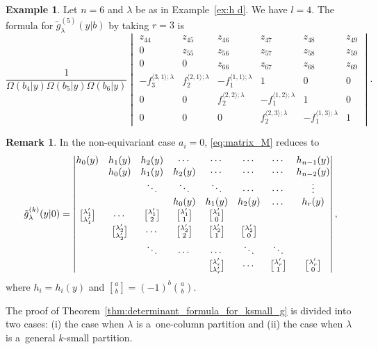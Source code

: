 \documentclass[10pt,a4paper]{amsart}
\numberwithin{equation}{section}
\newcommand{\la}{\lambda}
\theoremstyle{definition}
\newtheorem{Example}[Theorem]{Example}
\newtheorem{Remark}[Theorem]{Remark}
\begin{document}
\begin{Example}\label{ex:k small det}
Let $n=6$ and $\la$ be as in Example~\ref{ex:h d}. We have $l=4$.
The formula for $\tilde{g}^{(5)}_{\lambda}(y|b)$ by taking $r=3$ is
\[
\frac{1}{\Omega(b_4|y)\Omega(b_5|y)\Omega(b_6|y)}
\begin{vmatrix}
 z_{44}&z_{45}&z_{46}&z_{47}&z_{48}&z_{49}\\
 0&z_{55}&z_{56}&z_{57}&z_{58}&z_{59}\\
 0&0&z_{66}&z_{67}&z_{68}&z_{69}\\
 -f_3^{\langle 3,1\rangle;\la} & f_2^{\langle 2,1\rangle;\la} & -f_1^{\langle 1,1 \rangle;\la} & 1 & 0 & 0\\
 0&0&f_2^{\langle 2,2\rangle;\la}&-f_1^{\langle 1,2 \rangle;\la} & 1 &0\\
 0&0&0&f_2^{\langle 2,3\rangle;\la}&-f_1^{\langle 1,3 \rangle;\la} & 1
\end{vmatrix}.
\]
\end{Example}

\begin{Remark}
\bgroup
\renewcommand\binom[2]{\genfrac{[}{]}{0pt}{1}{#1}{#2}}
In the non-equivariant case $a_i=0$, \eqref{eq:matrix_M} reduces to
\[
\Tilde{g}^{(k)}_\lambda(y|0)=%
\begin{vmatrix}
h_0(y)&h_1(y)&h_2(y)&\cdots&\cdots&\cdots &\cdots &h_{n-1}(y)\\
&h_0(y)&h_1(y)&h_2(y)&\cdots&\cdots &\cdots &h_{n-2}(y)\\
&&\ddots&\ddots&\ddots&\cdots &\cdots &\vdots\\
&&&h_0(y)&h_1(y)&h_2(y)&\dots &h_r(y)\\
\binom{\lambda_1'}{\lambda_1'}&\cdots&\binom{\lambda_1'}{2}&\binom{\lambda_1'}{1}&\binom{\lambda_1'}{0}\\
&\binom{\lambda_2'}{\lambda_2'}&\cdots&\binom{\lambda_2'}{2}&\binom{\lambda'_2}{1}&\binom{\lambda_2'}{0}\\
&&\ddots&\cdots&\cdots&\ddots&\ddots\\
&&&&\binom{\lambda_r'}{\lambda_r'}&\cdots&\binom{\lambda_r'}{1}&\binom{\lambda_r'}{0}
\end{vmatrix},
\]
where $h_i=h_i(y)$ and $\binom{a}{b}=(-1)^b\genfrac{(}{)}{0pt}{1}{a}{b}$.
\egroup
\end{Remark}

The proof of Theorem~\ref{thm:determinant_formula_for_ksmall_g} is divided into two cases: (i) the case when $\lambda$ is a~one-column partition and (ii) the case when $\lambda$ is a~general $k$-small partition.
\end{document}
